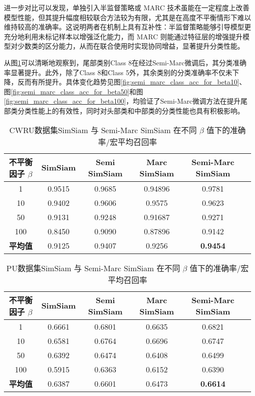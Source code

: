 \documentclass[master]{thesis-uestc}
\begin{document}
进一步对比可以发现，单独引入半监督策略或 MARC 技术虽能在一定程度上改善模型性能，但其提升幅度相较联合方法较为有限，尤其是在高度不平衡情形下难以维持较高的准确率。这说明两者在机制上具有互补性：半监督策略能够引导模型更充分地利用未标记样本以增强泛化能力，而 MARC 则能通过特征层的增强提升模型对少数类的区分能力，从而在联合使用时实现协同增益，显著提升分类性能。

从图\ref{simsiam_semi_results}可以清晰地观察到，尾部类别Class 8在经过Semi-Marc微调后，其分类准确率显著提升。此外，除了Class 8和Class 5外，其余类别的分类准确率不仅未下降，反而有所提升。具体变化趋势见图\ref{fig:semi_marc_class_acc_for_beta10}、图\ref{fig:semi_marc_class_acc_for_beta50}和图\ref{fig:semi_marc_class_acc_for_beta100}，均验证了Semi-Marc微调方法在提升尾部类分类性能上的有效性，同时对头部类和中部类的分类性能也具有积极影响。

\begin{table}[h]
    \caption{CWRU数据集SimSiam 与 Semi-Marc SimSiam 在不同 $\beta$ 值下的准确率/宏平均召回率}
    \centering
    \begin{tabular}{cccccc}
    \toprule
    不平衡因子 $\beta$  & SimSiam & Semi SimSiam & Marc SimSiam & Semi-Marc SimSiam \\
    \midrule
    1   & 0.9515 & 0.9685 & 0.94896 & 0.9781 \\
    10  & 0.9402 & 0.9606 & 0.9575  & 0.9623 \\
    50  & 0.9131 & 0.9248 & 0.91687 & 0.9271 \\
    100 & 0.8450 & 0.9090 & 0.87896 & 0.9142 \\
    \midrule
    \textbf{平均值} & 0.9125 & 0.9407 & 0.9256 & \textbf{0.9454} \\
    \bottomrule
    \end{tabular}
    \label{simsiam_semi_results}
\end{table}

\begin{table}[h]
    \caption{PU数据集SimSiam 与 Semi-Marc SimSiam 在不同 $\beta$ 值下的准确率/宏平均召回率}
    \centering
    \begin{tabular}{cccccc}
    \toprule
    不平衡因子 $\beta$  & SimSiam & Semi SimSiam & Marc SimSiam & Semi-Marc SimSiam \\
    \midrule
    1   & 0.6661 & 0.6801 & 0.6635 & 0.6821 \\
    10  & 0.6581 & 0.6764 & 0.6696 & 0.6747 \\
    50  & 0.6392 & 0.6474 & 0.6408 & 0.6499 \\
    100 & 0.5915 & 0.6363 & 0.6152 & 0.6390 \\
    \midrule
    \textbf{平均值} & 0.6387 & 0.6601 & 0.6473 & \textbf{0.6614} \\
    \bottomrule
    \end{tabular}
    \label{simsiam_semi_results_pu}
\end{table}
\end{document}

